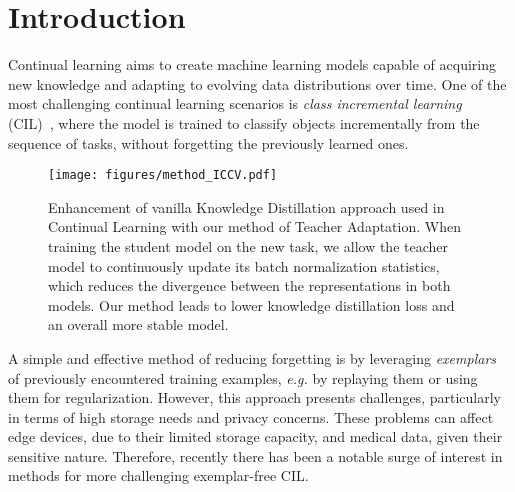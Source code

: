 \documentclass[10pt,twocolumn,letterpaper]{article}
\newcommand\bt[1]{{\color{blue} {\bf BT:} #1}}
\newcommand\rev[1]{{#1}}
\begin{document}
\section{Introduction}
\label{sec:intro}

Continual learning aims to create machine learning models capable of acquiring new knowledge and adapting to evolving data distributions over time.
One of the most challenging continual learning scenarios is \emph{class incremental learning} (CIL)~\cite{van2019three,masana2022class}, where the model is trained to classify objects incrementally from the sequence of tasks, without forgetting the previously learned ones. 

\begin{figure}[t]
    \centering
    \texttt{[image: figures/method\_ICCV.pdf]}

   \caption{
   \rev{
   Enhancement of vanilla Knowledge Distillation approach used in Continual Learning with our method of Teacher Adaptation. When training the student model on the new task, we allow the teacher model to continuously update its batch normalization statistics, which reduces the divergence between the representations in both models. Our method leads to lower knowledge distillation loss and an overall more stable model.}}
   \label{fig:method}
\end{figure}


A simple and effective method of reducing forgetting is by leveraging \emph{exemplars}~\cite{rebuffi2017icarl,iscen2022memory,bang2021rainbow,prabhu2020gdumb} of previously encountered training examples, {\it e.g.} by replaying them or using them for regularization.
However, this approach presents challenges, particularly in terms of high storage needs and privacy concerns. These problems can affect edge devices, due to their limited storage capacity, and medical data, given their sensitive nature. 
Therefore, recently there has been a notable surge of interest in methods for more challenging exemplar-free CIL.
\end{document}
